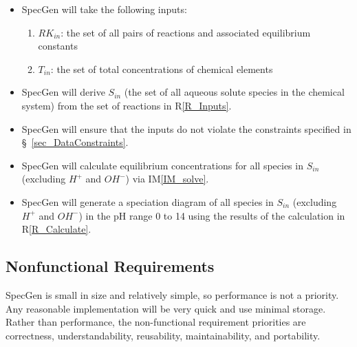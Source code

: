 \documentclass[12pt]{article}
\newcommand{\iref}[1]{IM\ref{#1}}
\newcounter{reqnum} %
\newcommand{\rref}[1]{R\ref{#1}}
\newcommand{\sref}[1]{\S~\ref{#1}}
\newcommand{\progname}{SpecGen} %
\begin{document}
\noindent \begin{itemize}

\item[R\refstepcounter{reqnum}\thereqnum \label{R_Inputs}:] \progname{} will 
  take the following inputs:
  \begin{enumerate} \item ${RK}_{in}$: the set of all pairs of reactions and 
                      associated equilibrium constants 
                    \item $T_{in}$: the set of total concentrations of chemical 
                      elements
  \end{enumerate}

\item[R\refstepcounter{reqnum}\thereqnum \label{R_DerivedInputs}:] \progname{} 
  will derive $S_{in}$ (the set of all aqueous solute species in the chemical 
  system) from the set of reactions in \rref{R_Inputs}.

\item[R\refstepcounter{reqnum}\thereqnum \label{R_ValidateInputs}:] \progname{} 
  will ensure that the inputs do not violate the constraints specified in 
  \sref{sec_DataConstraints}.

\item[R\refstepcounter{reqnum}\thereqnum \label{R_Calculate}:] \progname{} will 
  calculate equilibrium concentrations for all species in $S_{in}$ (excluding 
  $H^+$ and $OH^-$) via \iref{IM_solve}.

\item[R\refstepcounter{reqnum}\thereqnum \label{R_Output}:] \progname{} will 
  generate a speciation diagram of all species in $S_{in}$ (excluding $H^+$ and 
  $OH^-$) in the pH range 0 to 14 using the results of the calculation in 
  \rref{R_Calculate}.

\end{itemize}


\subsection{Nonfunctional Requirements}
\progname{} is small in size and relatively simple, so performance is not a 
priority. Any reasonable implementation will be very quick and use minimal 
storage. Rather than performance, the non-functional requirement priorities 
are correctness, understandability, reusability, maintainability, and 
portability. 
\end{document}
